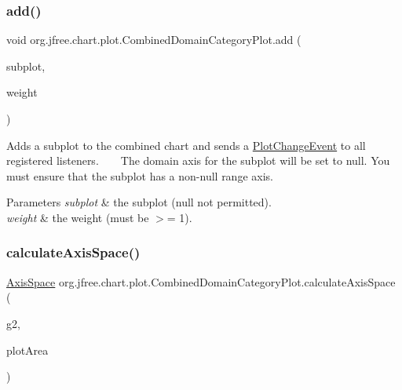 \subsubsection{\texorpdfstring{add()}{add()}\hspace{0.1cm}{\footnotesize\ttfamily [2/2]}}
{\footnotesize\ttfamily void org.\+jfree.\+chart.\+plot.\+Combined\+Domain\+Category\+Plot.\+add (\begin{DoxyParamCaption}\item[{\mbox{\hyperlink{classorg_1_1jfree_1_1chart_1_1plot_1_1_category_plot}{Category\+Plot}}}]{subplot,  }\item[{int}]{weight }\end{DoxyParamCaption})}

Adds a subplot to the combined chart and sends a \mbox{\hyperlink{}{Plot\+Change\+Event}} to all registered listeners. ~\newline
~\newline
 The domain axis for the subplot will be set to {\ttfamily null}. You must ensure that the subplot has a non-\/null range axis.


\begin{DoxyParams}{Parameters}
{\em subplot} & the subplot ({\ttfamily null} not permitted). \\
\hline
{\em weight} & the weight (must be $>$= 1). \\
\hline
\end{DoxyParams}
\mbox{\label{classorg_1_1jfree_1_1chart_1_1plot_1_1_combined_domain_category_plot_ac459e1e964ebb779d1a95bb9c681207a}} 
\subsubsection{\texorpdfstring{calculate\+Axis\+Space()}{calculateAxisSpace()}}
{\footnotesize\ttfamily \mbox{\hyperlink{classorg_1_1jfree_1_1chart_1_1axis_1_1_axis_space}{Axis\+Space}} org.\+jfree.\+chart.\+plot.\+Combined\+Domain\+Category\+Plot.\+calculate\+Axis\+Space (\begin{DoxyParamCaption}\item[{Graphics2D}]{g2,  }\item[{Rectangle2D}]{plot\+Area }\end{DoxyParamCaption})\hspace{0.3cm}{\ttfamily [protected]}}

